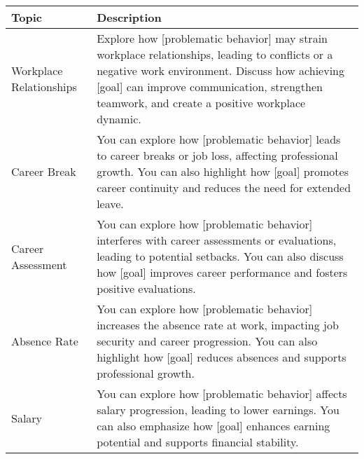 \begin{table*}[tb]
\centering
\begin{tabularx}{\textwidth}{lX}
\toprule
Topic            & Description                                            \\ \midrule
Workplace Relationships     & Explore how [problematic behavior] may strain workplace relationships, leading to conflicts or a negative work environment. Discuss how achieving [goal] can improve communication, strengthen teamwork, and create a positive workplace dynamic.                                                                                                                                                                                  \\ \hline
Career Break                & You can explore how [problematic behavior] leads to career breaks or job loss, affecting professional growth. You can also highlight how [goal] promotes career continuity and reduces the need for extended leave.                                                                                                                                                                                                                \\ \hline
Career Assessment           & You can explore how [problematic behavior] interferes with career assessments or evaluations, leading to potential setbacks. You can also discuss how [goal] improves career performance and fosters positive evaluations.                                                                                                                                                                                                         \\ \hline
Absence Rate                & You can explore how [problematic behavior] increases the absence rate at work, impacting job security and career progression. You can also highlight how [goal] reduces absences and supports professional growth.                                                                                                                                                                                                                 \\ \hline
Salary                      & You can explore how [problematic behavior] affects salary progression, leading to lower earnings. You can also emphasize how [goal] enhances earning potential and supports financial stability.                                                                                                                                                                                                                                   \\ \hline

\end{tabularx}
\end{table*}
